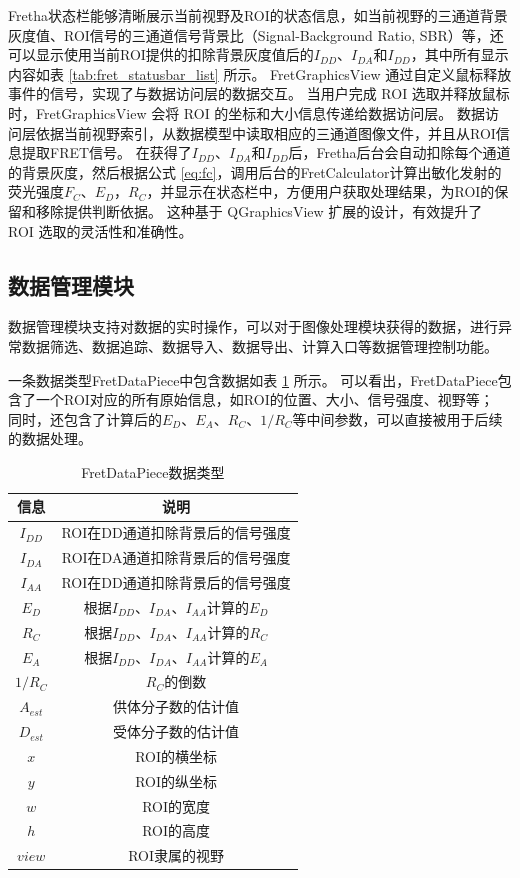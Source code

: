 Fretha状态栏能够清晰展示当前视野及ROI的状态信息，如当前视野的三通道背景灰度值、ROI信号的三通道信号背景比（Signal-Background Ratio, SBR）等，还可以显示使用当前ROI提供的扣除背景灰度值后的$I_{DD}$、$I_{DA}$和$I_{DD}$，其中所有显示内容如表 \ref{tab:fret_statusbar_list} 所示。
FretGraphicsView 通过自定义鼠标释放事件的信号，实现了与数据访问层的数据交互。
当用户完成 ROI 选取并释放鼠标时，FretGraphicsView 会将 ROI 的坐标和大小信息传递给数据访问层。
数据访问层依据当前视野索引，从数据模型中读取相应的三通道图像文件，并且从ROI信息提取FRET信号。
在获得了$I_{DD}$、$I_{DA}$和$I_{DD}$后，Fretha后台会自动扣除每个通道的背景灰度，然后根据公式 \ref{eq:fc}，调用后台的FretCalculator计算出敏化发射的荧光强度$F_C$、$E_D$，$R_C$，并显示在状态栏中，方便用户获取处理结果，为ROI的保留和移除提供判断依据。
这种基于 QGraphicsView 扩展的设计，有效提升了 ROI 选取的灵活性和准确性。 

\subsection{数据管理模块}
\label{sec:数据管理模块}

数据管理模块支持对数据的实时操作，可以对于图像处理模块获得的数据，进行异常数据筛选、数据追踪、数据导入、数据导出、计算入口等数据管理控制功能。

一条数据类型FretDataPiece中包含数据如表 \ref{tab:数据项内容定义} 所示。
可以看出，FretDataPiece包含了一个ROI对应的所有原始信息，如ROI的位置、大小、信号强度、视野等；
同时，还包含了计算后的$E_D$、$E_A$、$R_C$、$1/R_C$等中间参数，可以直接被用于后续的数据处理。

\begin{table}[htbp]
  \centering
  \caption{FretDataPiece数据类型}
  \label{tab:数据项内容定义}
    \begin{tabular}{cc}
      \toprule[1.5pt]
      {信息} & {说明} \\
      \midrule
      $I_{DD}$ & ROI在DD通道扣除背景后的信号强度 \\
      $I_{DA}$ & ROI在DA通道扣除背景后的信号强度 \\
      $I_{AA}$ & ROI在DD通道扣除背景后的信号强度 \\
      $E_D$ & 根据$I_{DD}$、$I_{DA}$、$I_{AA}$计算的$E_D$ \\
      $R_C$ & 根据$I_{DD}$、$I_{DA}$、$I_{AA}$计算的$R_C$ \\
      $E_A$ & 根据$I_{DD}$、$I_{DA}$、$I_{AA}$计算的$E_A$ \\
      $1/R_C$ & $R_C$的倒数 \\
      $A_{est}$ & 供体分子数的估计值 \\
      $D_{est}$ & 受体分子数的估计值 \\
      $x$ & ROI的横坐标 \\
      $y$ & ROI的纵坐标 \\
      $w$ & ROI的宽度 \\
      $h$ & ROI的高度 \\
      $view$ & ROI隶属的视野\\
      \bottomrule[1.5pt]
    \end{tabular}
\end{table}

